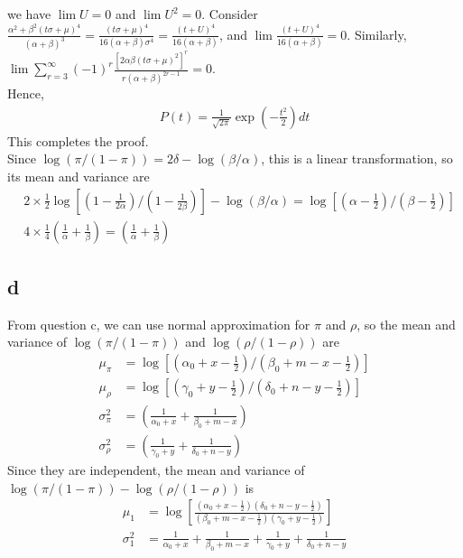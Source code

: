 \documentclass[11pt]{article}
\begin{document}
we have \(\lim U=0\) and \(\lim U^2=0\). Consider
\(\frac{\alpha^2+\beta^2(t\sigma+\mu)^4}{(\alpha+\beta)^3}=\frac{(t\sigma+\mu)^4}{16(\alpha+\beta)\sigma^4}=\frac{(t+U)^4}{16(\alpha+\beta)}\),
and \(\lim \frac{(t+U)^4}{16(\alpha+\beta)}=0\). Similarly,
\(\lim \sum_{r=3}^\infty (-1)^r\frac{[2\alpha\beta(t\sigma+\mu)^2]^r}{r(\alpha+\beta)^{2r-1}}=0\).\\
Hence, \[\begin{align}
    P(t)=\frac{1}{\sqrt{2\pi}} \exp(-\frac{t^2}{2})dt
\end{align}\] This completes the proof.\\
Since \(\log(\pi/(1-\pi))=2\delta-\log(\beta/\alpha)\), this is a linear
transformation, so its mean and variance are \[\begin{align}
    &2\times \frac{1}{2}\log\left[(1-\frac{1}{2\alpha})/(1-\frac{1}{2\beta})\right] - \log(\beta/\alpha)=\log\left[(\alpha-\frac{1}{2})/(\beta-\frac{1}{2})\right] \\
    &4\times \frac{1}{4}\left(\frac{1}{\alpha}+\frac{1}{\beta}\right)=\left(\frac{1}{\alpha}+\frac{1}{\beta}\right)
\end{align}\]

    \hypertarget{d}{%
\subsection{d}\label{d}}

    From question c, we can use normal approximation for \(\pi\) and
\(\rho\), so the mean and variance of \(\log(\pi/(1-\pi))\) and
\(\log(\rho/(1-\rho))\) are \[\begin{align}
    \mu_{\pi}&= \log\left[(\alpha_0+x-\frac{1}{2})/(\beta_0+m-x-\frac{1}{2})\right] \\
    \mu_{\rho}&= \log\left[(\gamma_0+y-\frac{1}{2})/(\delta_0+n-y-\frac{1}{2})\right] \\
    \sigma_{\pi}^2&= \left(\frac{1}{\alpha_0+x}+\frac{1}{\beta_0+m-x}\right) \\
    \sigma_{\rho}^2&= \left(\frac{1}{\gamma_0+y}+\frac{1}{\delta_0+n-y}\right)
\end{align}\] Since they are independent, the mean and variance of
\(\log(\pi/(1-\pi)) - \log(\rho/(1-\rho))\) is \[\begin{align}
    \mu_1&= \log\left[\frac{(\alpha_0+x-\frac{1}{2})(\delta_0+n-y-\frac{1}{2})}{(\beta_0+m-x-\frac{1}{2})(\gamma_0+y-\frac{1}{2})}\right] \\
    \sigma_1^2&= \frac{1}{\alpha_0+x}+\frac{1}{\beta_0+m-x}+\frac{1}{\gamma_0+y}+\frac{1}{\delta_0+n-y}
\end{align}\]
\end{document}
